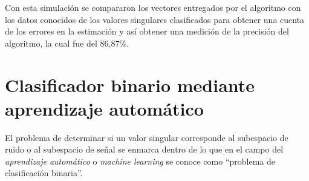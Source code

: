 Con esta simulación se compararon los vectores entregados por el algoritmo con los datos conocidos de los valores singulares clasificados para obtener una cuenta de los errores en la estimación y así obtener una medición de la precisión del algoritmo, la cual fue del 86,87\%.

\section{Clasificador binario mediante aprendizaje automático}

El problema de determinar si un valor singular corresponde al subespacio de ruido o al subespacio de señal se enmarca dentro de lo que en el campo del \emph{aprendizaje automático} o \emph{machine learning} se conoce como ``problema de clasificación binaria''.

